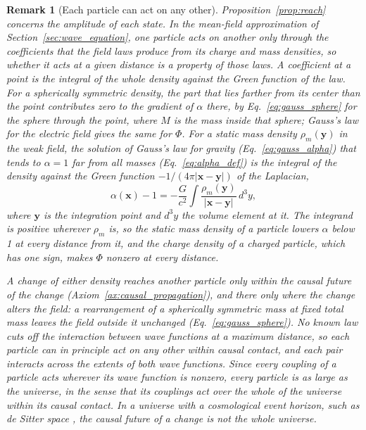 \documentclass[aps,prd,onecolumn,tightenlines,nofootinbib,notitlepage,11pt,floatfix]{revtex4-2}
\theoremstyle{indentedtheorem}
\newtheorem{remark}{Remark}
\begin{document}
\begin{remark}[Each particle can act on any other]\label{rem:reach}
Proposition~\ref{prop:reach} concerns the amplitude of each state. In the mean-field approximation of Section~\ref{sec:wave_equation}, one particle acts on another only through the coefficients that the field laws produce from its charge and mass densities, so whether it acts at a given distance is a property of those laws. A coefficient at a point is the integral of the whole density against the Green function of the law. For a spherically symmetric density, the part that lies farther from its center than the point contributes zero to the gradient of $\alpha$ there, by Eq.~\eqref{eq:gauss_sphere} for the sphere through the point, where $M$ is the mass inside that sphere; Gauss's law for the electric field gives the same for $\Phi$. For a static mass density $\rho_m(\mathbf{y})$ in the weak field, the solution of Gauss's law for gravity (Eq.~\eqref{eq:gauss_alpha}) that tends to $\alpha=1$ far from all masses (Eq.~\eqref{eq:alpha_def}) is the integral of the density against the Green function $-1/(4\pi|\mathbf{x}-\mathbf{y}|)$ of the Laplacian,
\begin{equation}
    \alpha(\mathbf{x}) - 1 = -\frac{G}{c^2}\int\frac{\rho_m(\mathbf{y})}{|\mathbf{x}-\mathbf{y}|} \, d^3y ,
    \label{eq:static_density_clock_field}
\end{equation}
where $\mathbf{y}$ is the integration point and $d^3y$ the volume element at it. The integrand is positive wherever $\rho_m$ is, so the static mass density of a particle lowers $\alpha$ below 1 at every distance from it, and the charge density of a charged particle, which has one sign, makes $\Phi$ nonzero at every distance.

A change of either density reaches another particle only within the causal future of the change (Axiom~\ref{ax:causal_propagation}), and there only where the change alters the field: a rearrangement of a spherically symmetric mass at fixed total mass leaves the field outside it unchanged (Eq.~\eqref{eq:gauss_sphere}). No known law cuts off the interaction between wave functions at a maximum distance, so each particle can in principle act on any other within causal contact, and each pair interacts across the extents of both wave functions. Since every coupling of a particle acts wherever its wave function is nonzero, every particle is as large as the universe, in the sense that its couplings act over the whole of the universe within its causal contact. In a universe with a cosmological event horizon, such as de Sitter space \citep{Gibbons1977Cosmological}, the causal future of a change is not the whole universe.


\end{remark}
\end{document}
